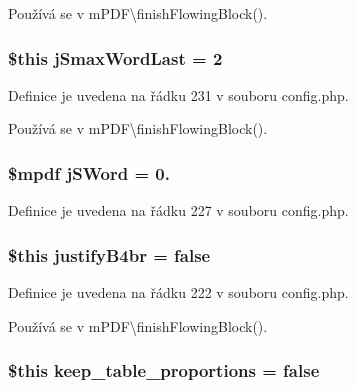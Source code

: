Používá se v m\-P\-D\-F\textbackslash{}finish\-Flowing\-Block().

\hypertarget{config_8php_a539b9f697ec4e5a0e8c753d79f90c02a}{
\subsubsection[{j\-Smax\-Word\-Last}]{\setlength{\rightskip}{0pt plus 5cm}\$this j\-Smax\-Word\-Last = 2}}\label{config_8php_a539b9f697ec4e5a0e8c753d79f90c02a}


Definice je uvedena na řádku 231 v souboru config.\-php.



Používá se v m\-P\-D\-F\textbackslash{}finish\-Flowing\-Block().

\hypertarget{config_8php_aa76c1542a6a06552e112e7c9e63ef8eb}{
\subsubsection[{j\-S\-Word}]{\setlength{\rightskip}{0pt plus 5cm}\$mpdf j\-S\-Word = 0.}}\label{config_8php_aa76c1542a6a06552e112e7c9e63ef8eb}


Definice je uvedena na řádku 227 v souboru config.\-php.

\hypertarget{config_8php_a8ecebea6205147353d33a9e945d39ebd}{
\subsubsection[{justify\-B4br}]{\setlength{\rightskip}{0pt plus 5cm}\$this justify\-B4br = {\bf false}}}\label{config_8php_a8ecebea6205147353d33a9e945d39ebd}


Definice je uvedena na řádku 222 v souboru config.\-php.



Používá se v m\-P\-D\-F\textbackslash{}finish\-Flowing\-Block().

\hypertarget{config_8php_ac52437a9c272ea633aaefcd6f27e0dcc}{
\subsubsection[{keep\-\_\-table\-\_\-proportions}]{\setlength{\rightskip}{0pt plus 5cm}\$this keep\-\_\-table\-\_\-proportions = {\bf false}}}\label{config_8php_ac52437a9c272ea633aaefcd6f27e0dcc}


